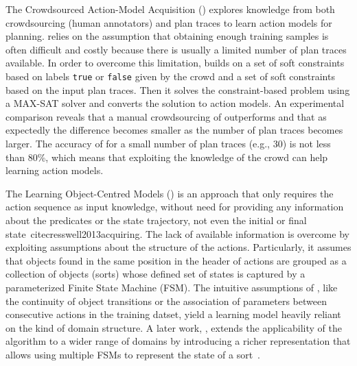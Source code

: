 The Crowdsourced Action-Model Acquisition (\textbf{\CAMA}) \cite{Zhuo15} explores knowledge from both crowdsourcing (human annotators) and plan traces to learn action models for planning. \CAMA relies on the assumption that obtaining enough training samples is often difficult and costly because there is usually a limited number of plan traces available. In order to overcome this limitation, \CAMA builds on a set of soft constraints based on labels \texttt{true} or \texttt{false} given by the crowd and a set of soft constraints based on the input plan traces. Then it solves the constraint-based problem using a MAX-SAT solver and converts the solution to action models. An experimental comparison reveals that a manual crowdsourcing of \CAMA outperforms \ARMS and that as expectedly the difference becomes smaller as the number of plan traces becomes larger. The accuracy of \CAMA for a small number of plan traces (e.g., 30) is not less than 80\%, which means that exploiting the knowledge of the crowd can help learning action models.



The Learning Object-Centred Models (\textbf{\LOCM}) is an approach that only requires the \FO action sequence as input knowledge, without need for providing any information about the predicates or the state trajectory, not even the initial or final state~cite{cresswell2013acquiring}. The lack of available information is overcome by exploiting assumptions about the structure of the actions. Particularly, it assumes that objects found in the same position in the header of actions are grouped as a collection of objects (sorts) whose defined set of states is captured by a parameterized Finite State Machine (FSM). The intuitive assumptions of \LOCM, like the continuity of object transitions or the association of parameters between consecutive actions in the training datset, yield a learning model heavily reliant on the kind of domain structure. A later work, \textbf{\LOCMtwo}, extends the applicability of the \LOCM algorithm to a wider range of domains by introducing a richer representation that allows using multiple FSMs to represent the state of a sort~\cite{cresswell2011generalised}.

